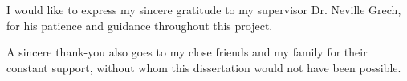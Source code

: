 \begin{acknowledgements}
I would like to express my sincere gratitude to my supervisor Dr. Neville Grech, for his patience and guidance throughout this project.
\par A sincere thank-you also goes to my close friends and my family for their constant support, without whom this dissertation would not have 
been possible.
\end{acknowledgements}